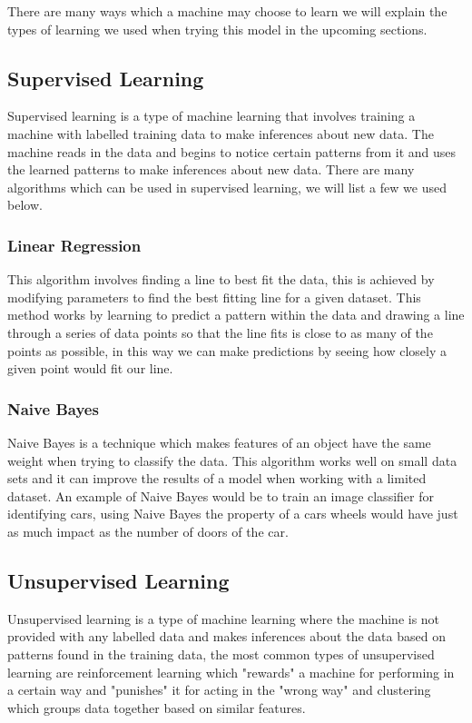 \documentclass[conference]{IEEEtran}
\begin{document}
There are many ways which a machine may choose to learn we will explain the types of learning we used when trying this model in the upcoming sections.

\subsection{Supervised Learning}
Supervised learning is a type of machine learning that involves training a machine with labelled training data to make inferences about new data.  The machine reads in the data and begins to notice certain patterns from it and uses the learned patterns to make inferences about new data.  There are many algorithms which can be used in supervised learning, we will list a few we used below.  
\vspace{2mm}
\subsubsection{Linear Regression}
This algorithm involves finding a line to best fit the data, this is achieved by modifying parameters to find the best fitting line for a given dataset. This method works by learning to predict a pattern within the data and drawing a line through a series of data points so that the line fits is close to as many of the points as possible, in this way we can make predictions by seeing how closely a given point would fit our line.  
\vspace{2mm}
\subsubsection{Naive Bayes}
Naive Bayes is a technique which makes features of an object have the same weight when trying to classify the data.  This algorithm works well on small data sets and it can improve the results of a model when working with a limited dataset.  An example of Naive Bayes would be to train an image classifier for identifying cars, using Naive Bayes the property of a cars wheels would have just as much impact as the number of doors of the car.
\subsection{Unsupervised Learning}
Unsupervised learning is a type of machine learning where the machine is not provided with any labelled data and makes inferences about the data based on patterns found in the training data, the most common types of unsupervised learning are reinforcement learning which "rewards" a machine for performing in a certain way and "punishes" it for acting in the "wrong way" and clustering which groups data together based on similar features.
\end{document}
